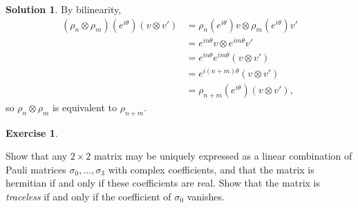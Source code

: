 \documentclass[11pt, a4paper]{report}
\theoremstyle{definition}
\newtheorem{exercise}{Exercise}[part]
\newtheorem{solution}{Solution}[part]
\newenvironment{ex}{\begin{exercise}}{\end{exercise}\pagebreak[1]}
\newenvironment{sol}{\begin{solution}}{\end{solution}\pagebreak[3]}
\begin{document}
\begin{sol}

By bilinearity,
\begin{align*}
    (\rho_n \otimes \rho_m) (e^{i\theta}) (v \otimes v') &= \rho_n(e^{i\theta}) v \otimes \rho_m(e^{i\theta}) v' \\
        &= e^{in\theta} v \otimes e^{im\theta} v' \\
        &= e^{in\theta} e^{im\theta} (v \otimes v') \\
        &= e^{i(n + m)\theta} (v \otimes v') \\
        &= \rho_{n + m}(e^{i\theta}) (v \otimes v'),
\end{align*}
so $\rho_n \otimes \rho_m$ is equivalent to $\rho_{n + m}$.

\end{sol}

\begin{ex}\label{ex:paulimatrices}

Show that any $2 \times 2$ matrix may be uniquely expressed as a linear combination of Pauli matrices $\sigma_0, \ldots, \sigma_3$ with complex coefficients, and that the matrix is hermitian if and only if these coefficients are real.
Show that the matrix is \emph{traceless} if and only if the coefficient of $\sigma_0$ vanishes.

\end{ex}
\end{document}
